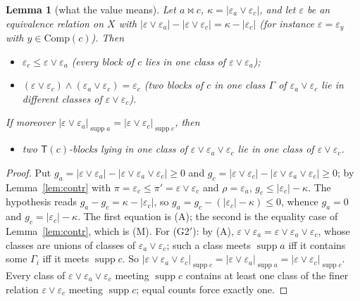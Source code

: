 \documentclass[11pt]{amsart}
\newtheorem{lemma}[theorem]{Lemma}
\theoremstyle{definition}
\newcommand{\supp}{\operatorname{supp}}
\newcommand{\T}{\mathsf{T}}
\newcommand{\mt}{\bowtie}   %
\begin{document}
\begin{lemma}[what the value means]\label{lem:value}
Let $a\mt c$, $\kappa=|\varepsilon_a\vee\varepsilon_c|$, and let $\varepsilon$ be an equivalence relation on $X$ with $|\varepsilon\vee\varepsilon_a|-|\varepsilon\vee\varepsilon_c|=\kappa-|\varepsilon_c|$ (for instance $\varepsilon=\varepsilon_y$ with $y\in\mathrm{Comp}(c)$). Then
\begin{itemize}[nosep]
\item[(A)] $\varepsilon_c\le\varepsilon\vee\varepsilon_a$ \textup{(}every block of $c$ lies in one class of $\varepsilon\vee\varepsilon_a$\textup{)};
\item[(M)] $(\varepsilon\vee\varepsilon_c)\wedge(\varepsilon_a\vee\varepsilon_c)=\varepsilon_c$ \textup{(}two blocks of $c$ in one class $\Gamma$ of $\varepsilon_a\vee\varepsilon_c$ lie in different classes of $\varepsilon\vee\varepsilon_c$\textup{)}.
\end{itemize}
If moreover $|\varepsilon\vee\varepsilon_a|_{\supp a}=|\varepsilon\vee\varepsilon_c|_{\supp c}$, then
\begin{itemize}[nosep]
\item[(G2$'$)] two $\T(c)$-blocks lying in one class of $\varepsilon\vee\varepsilon_a\vee\varepsilon_c$ lie in one class of $\varepsilon\vee\varepsilon_c$.
\end{itemize}
\end{lemma}

\begin{proof}
Put $g_a=|\varepsilon\vee\varepsilon_a|-|\varepsilon\vee\varepsilon_a\vee\varepsilon_c|\ge0$ and $g_c=|\varepsilon\vee\varepsilon_c|-|\varepsilon\vee\varepsilon_a\vee\varepsilon_c|\ge0$; by Lemma~\ref{lem:contr} with $\pi=\varepsilon_c\le\pi'=\varepsilon\vee\varepsilon_c$ and $\rho=\varepsilon_a$, $g_c\le|\varepsilon_c|-\kappa$. The hypothesis reads $g_a-g_c=\kappa-|\varepsilon_c|$, so $g_a=g_c-(|\varepsilon_c|-\kappa)\le0$, whence $g_a=0$ and $g_c=|\varepsilon_c|-\kappa$. The first equation is (A); the second is the equality case of Lemma~\ref{lem:contr}, which is (M). For (G2$'$): by (A), $\varepsilon\vee\varepsilon_a=\varepsilon\vee\varepsilon_a\vee\varepsilon_c$, whose classes are unions of classes of $\varepsilon_a\vee\varepsilon_c$; such a class meets $\supp a$ iff it contains some $\Gamma_i$ iff it meets $\supp c$. So $|\varepsilon\vee\varepsilon_a\vee\varepsilon_c|_{\supp c}=|\varepsilon\vee\varepsilon_a|_{\supp a}=|\varepsilon\vee\varepsilon_c|_{\supp c}$. Every class of $\varepsilon\vee\varepsilon_a\vee\varepsilon_c$ meeting $\supp c$ contains at least one class of the finer relation $\varepsilon\vee\varepsilon_c$ meeting $\supp c$; equal counts force exactly one.
\end{proof}
\end{document}
